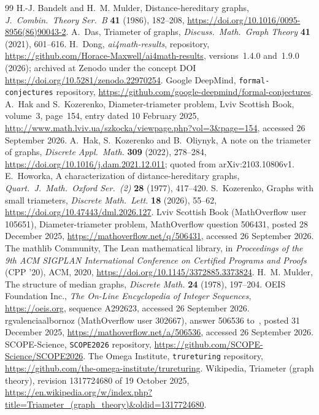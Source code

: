\documentclass[11pt]{article}
\theoremstyle{remark}
\newcommand{\repoversion}{1.9.0}
\begin{document}
{\small
\begin{thebibliography}{99}
H.-J. Bandelt and H.~M. Mulder, Distance-hereditary graphs, \emph{J.\ Combin.\
Theory Ser.~B} \textbf{41} (1986), 182--208,
\url{https://doi.org/10.1016/0095-8956(86)90043-2}.
A.~Das, Triameter of graphs, \emph{Discuss.\ Math.\ Graph Theory} \textbf{41}
(2021), 601--616.
H.~Dong, \emph{ai4math-results}, repository,
\url{https://github.com/Horace-Maxwell/ai4math-results}, versions~1.4.0
and~\repoversion{} (2026); archived at Zenodo under the concept DOI
\url{https://doi.org/10.5281/zenodo.22970254}.
Google DeepMind, \texttt{formal-conjectures} repository,
\url{https://github.com/google-deepmind/formal-conjectures}.
A.~Hak and S.~Kozerenko, Diameter-triameter problem, Lviv Scottish Book,
volume~3, page~154, entry dated 10 February 2025,
\url{http://www.math.lviv.ua/szkocka/viewpage.php?vol=3&page=154}, accessed 26
September 2026.
A.~Hak, S.~Kozerenko and B.~Oliynyk, A note on the triameter of graphs,
\emph{Discrete Appl.\ Math.} \textbf{309} (2022), 278--284,
\url{https://doi.org/10.1016/j.dam.2021.12.011}; quoted from
arXiv:2103.10806v1.
E.~Howorka, A characterization of distance-hereditary graphs, \emph{Quart.\ J.\
Math.\ Oxford Ser.~(2)} \textbf{28} (1977), 417--420.
\bibitem{koz}
S.~Kozerenko, Graphs with small triameters, \emph{Discrete Math.\ Lett.}
\textbf{18} (2026), 55--62, \url{https://doi.org/10.47443/dml.2026.127}.
\bibitem{mo-q}
Lviv Scottish Book (MathOverflow user 105651), Diameter-triameter problem,
MathOverflow question 506431, posted 28 December 2025,
\url{https://mathoverflow.net/q/506431},
accessed 26 September 2026.
\bibitem{mathlib}
The mathlib Community, The Lean mathematical library, in \emph{Proceedings of
the 9th ACM SIGPLAN International Conference on Certified Programs and Proofs}
(CPP '20), ACM, 2020, \url{https://doi.org/10.1145/3372885.3373824}.
\bibitem{mulder}
H.~M. Mulder, The structure of median graphs, \emph{Discrete Math.}
\textbf{24} (1978), 197--204.
\bibitem{oeis}
OEIS Foundation Inc., \emph{The On-Line Encyclopedia of Integer Sequences},
\url{https://oeis.org}, sequence A292623, accessed 26 September 2026.
\bibitem{mo-a}
rgvalenciaalbornoz (MathOverflow user 302667), answer 506536 to~\cite{mo-q},
posted 31 December 2025, \url{https://mathoverflow.net/a/506536}, accessed 26
September 2026.
\bibitem{scope}
SCOPE-Science, \texttt{SCOPE2026} repository,
\url{https://github.com/SCOPE-Science/SCOPE2026}.
\bibitem{tru}
The Omega Institute, \texttt{trureturing} repository,
\url{https://github.com/the-omega-institute/trureturing}.
\bibitem{wiki}
Wikipedia, Triameter (graph theory), revision 1317724680 of 19 October 2025,
\url{https://en.wikipedia.org/w/index.php?title=Triameter_(graph_theory)&oldid=1317724680}.
\end{thebibliography}}
\end{document}
